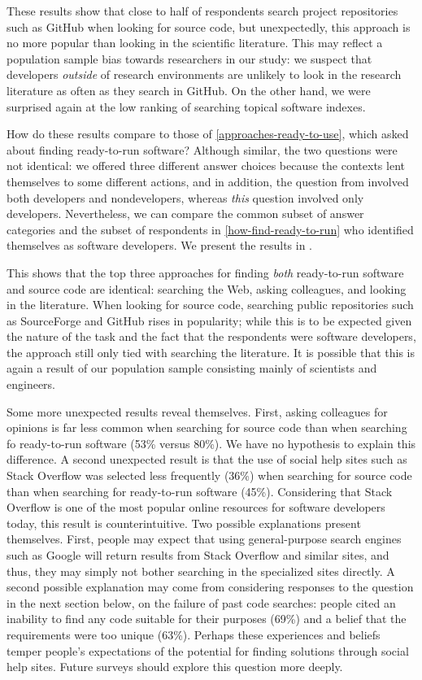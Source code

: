 \documentclass{casicswhitepaper}
\begin{document}
These results show that close to half of respondents search project repositories such as GitHub when looking for source code, but unexpectedly, this approach is no more popular than looking in the scientific literature.  This may reflect a population sample bias towards researchers in our study: we suspect that developers \emph{outside} of research environments are unlikely to look in the research literature as often as they search in GitHub.  On the other hand, we were surprised again at the low ranking of searching topical software indexes.

How do these results compare to those of \ref{approaches-ready-to-use}, which asked about finding ready-to-run software?  Although similar, the two questions were not identical: we offered three different answer choices because the contexts lent themselves to some different actions, and in addition, the question from  involved both developers and nondevelopers, whereas \emph{this} question involved only developers.  Nevertheless, we can compare the common subset of answer categories and the subset of respondents in \ref{how-find-ready-to-run} who identified themselves as software developers.  We present the results in .

This shows that the top three approaches for finding \emph{both} ready-to-run software and source code are identical: searching the Web, asking colleagues, and looking in the literature.  When looking for source code, searching public repositories such as SourceForge and GitHub rises in popularity; while this is to be expected given the nature of the task and the fact that the respondents were software developers, the approach still only tied with searching the literature.  It is possible that this is again a result of our population sample consisting mainly of scientists and engineers.

Some more unexpected results reveal themselves.  First, asking colleagues for opinions is far less common when searching for source code than when searching fo ready-to-run software (53\% versus 80\%).  We have no hypothesis to explain this difference.  A second unexpected result is that the use of social help sites such as Stack Overflow was selected less frequently (36\%) when searching for source code than when searching for ready-to-run software (45\%).  Considering that Stack Overflow is one of the most popular online resources for software developers today, this result is counterintuitive.  Two possible explanations present themselves.  First, people may expect that using general-purpose search engines such as Google will return results from Stack Overflow and similar sites, and thus, they may simply not bother searching in the specialized sites directly.  A second possible explanation may come from considering responses to the question in the next section below, on the failure of past code searches: people cited an inability to find any code suitable for their purposes (69\%) and a belief that the requirements were too unique (63\%).  Perhaps these experiences and beliefs temper people's expectations of the potential for finding solutions through social help sites.  Future surveys should explore this question more deeply.
\end{document}
